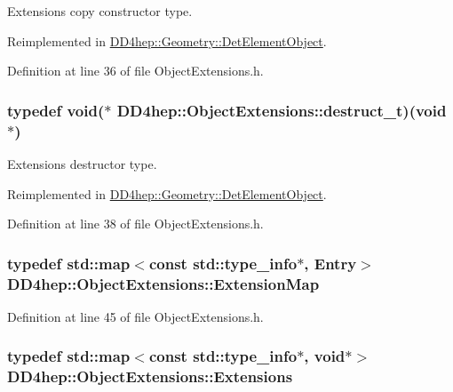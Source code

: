 Extensions copy constructor type. 

Reimplemented in \hyperlink{class_d_d4hep_1_1_geometry_1_1_det_element_object_a2780058563d2399014b51afa789ebd21}{DD4hep::Geometry::DetElementObject}.

Definition at line 36 of file ObjectExtensions.h.\hypertarget{class_d_d4hep_1_1_object_extensions_af9ca2813f0d7fa65ac13d905d9721cdf}{
\subsubsection[{destruct\_\-t}]{\setlength{\rightskip}{0pt plus 5cm}typedef void($\ast$ {\bf DD4hep::ObjectExtensions::destruct\_\-t})(void $\ast$)}}
\label{class_d_d4hep_1_1_object_extensions_af9ca2813f0d7fa65ac13d905d9721cdf}


Extensions destructor type. 

Reimplemented in \hyperlink{class_d_d4hep_1_1_geometry_1_1_det_element_object_af4773c2a725fc7076297670a7ae1ac41}{DD4hep::Geometry::DetElementObject}.

Definition at line 38 of file ObjectExtensions.h.\hypertarget{class_d_d4hep_1_1_object_extensions_a22c0e42d5fdc9f3fda39c2c3bec14341}{
\subsubsection[{ExtensionMap}]{\setlength{\rightskip}{0pt plus 5cm}typedef std::map$<$const std::type\_\-info$\ast$, {\bf Entry}$>$ {\bf DD4hep::ObjectExtensions::ExtensionMap}}}
\label{class_d_d4hep_1_1_object_extensions_a22c0e42d5fdc9f3fda39c2c3bec14341}


Definition at line 45 of file ObjectExtensions.h.\hypertarget{class_d_d4hep_1_1_object_extensions_a882c1e22567a450f60d83eb735dd3532}{
\subsubsection[{Extensions}]{\setlength{\rightskip}{0pt plus 5cm}typedef std::map$<$const std::type\_\-info$\ast$, void$\ast$$>$ {\bf DD4hep::ObjectExtensions::Extensions}}}
\label{class_d_d4hep_1_1_object_extensions_a882c1e22567a450f60d83eb735dd3532}


